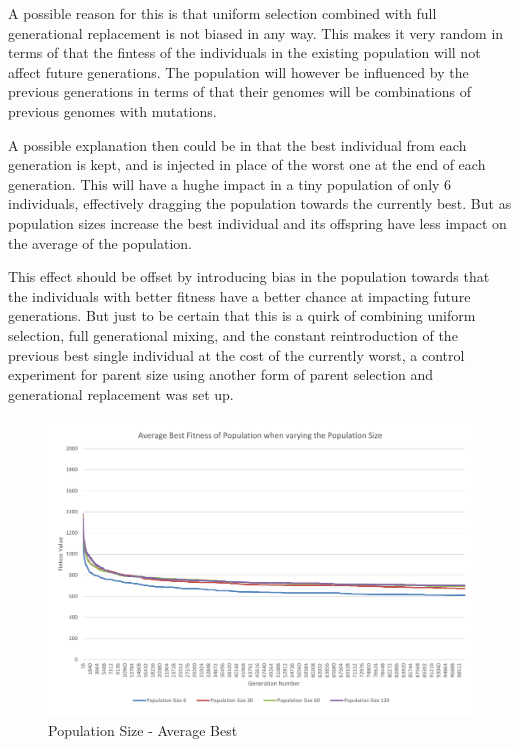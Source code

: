 A possible reason for this is that uniform selection combined with full generational replacement is not biased in any way. This makes it very random in terms of that the fintess of the individuals in the existing population will not affect future generations. The population will however be influenced by the previous generations in terms of that their genomes will be combinations of previous genomes with mutations.

A possible explanation then could be in that the best individual from each generation is kept, and is injected in place of the worst one at the end of each generation. This will have a hughe impact in a tiny population of only 6 individuals, effectively dragging the population towards the currently best. But as population sizes increase the best individual and its offspring have less impact on the average of the population.

This effect should be offset by introducing bias in the population towards that the individuals with better fitness have a better chance at impacting future generations. But just to be certain that this is a quirk of combining uniform selection, full generational mixing, and the constant reintroduction of the previous best single individual at the cost of the currently worst, a control experiment for parent size using another form of parent selection and generational replacement was set up.

\begin{landscape}
\begin{figure}[thbp]
	\centerline{\includegraphics[height=0.945\textwidth]{figures/CircleTests/PopulationSize/CircleTestsPopulationAverageBest.pdf}}
	\caption{Population Size - Average Best}
	\label{fig:ctpab}
\end{figure}
\end{landscape}

